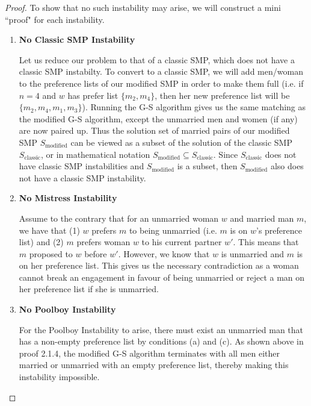 \documentclass[11pt, oneside]{article}   	%
\theoremstyle{definition}
\theoremstyle{remark}
\begin{document}
\begin{proof}
To show that no such instability may arise, we will construct a mini ``proof" for each instability.

\begin{enumerate}
	\item \textbf{No Classic SMP Instability}
	
	Let us reduce our problem to that of a classic SMP, which does not have a classic SMP instabilty. To convert to a classic SMP, we will add men/woman to the preference lists of our modified SMP in order to make them full (i.e. if $n=4$ and $w$ has prefer list $\{m_2, m_4\}$, then her new preference list will be $\{m_2, m_4, m_1, m_3\}$). Running the G-S algorithm gives us the same matching as the modified G-S algorithm, except  the unmarried men and women (if any) are now paired up. Thus the solution set of married pairs of our modified SMP $S_\text{modified}$ can be viewed as a subset of the solution of the classic SMP $S_\text{classic}$, or in mathematical notation $S_\text{modified} \subseteq S_\text{classic}$. Since $S_\text{classic}$ does not have classic SMP instabilities and $S_\text{modified}$ is a subset, then  $S_\text{modified}$ also does not have a classic SMP instability.

	\item \textbf{No Mistress Instability}
	
	Assume to the contrary that for an unmarried woman $w$ and married man $m$, we have that (1) $w$ prefers $m$ to being unmarried (i.e. $m$ is on $w$'s preference list) and (2) $m$ prefers woman $w$ to his current partner $w'$. This means that $m$ proposed to $w$ before $w'$. However, we know that $w$ is unmarried and $m$ is on her preference list. This gives us the necessary contradiction as a woman cannot break an engagement in favour of being unmarried or reject a man on her preference list if she is unmarried.

	\item \textbf{No Poolboy Instability}
	
	For the Poolboy Instability to arise, there must exist an unmarried man that has a non-empty preference list by conditions (a) and (c). As shown above in proof 2.1.4, the modified G-S algorithm terminates with all men either married or unmarried with an empty preference list, thereby making this instability impossible.
	
\end{enumerate}
\end{proof}
\end{document}
